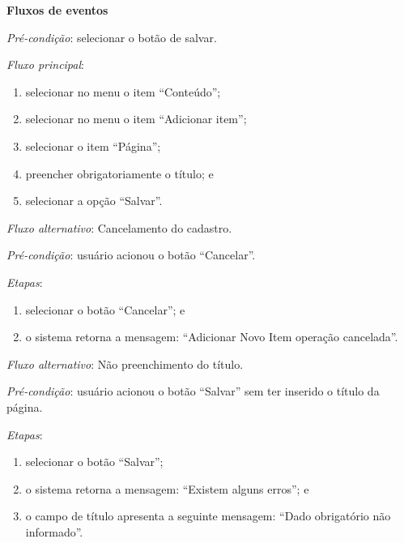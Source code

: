 \documentclass[a4paper,12pt]{article}
\begin{document}
\begin{center}
\textbf{\huge{Fluxos de eventos}}
\end{center}

\vspace{0.7cm}

\noindent \textit{Pré-condição}: selecionar o botão de salvar.

\noindent \textit{Fluxo principal}:

\begin{enumerate}
    \item selecionar no menu o item ``Conteúdo'';
    \item selecionar no menu o item ``Adicionar item'';
    \item selecionar o item ``Página'';
    \item preencher obrigatoriamente o título; e
    \item selecionar a opção ``Salvar''.
\end{enumerate}

\noindent \textit{Fluxo alternativo}: Cancelamento do cadastro.

\noindent \textit{Pré-condição}: usuário acionou o botão ``Cancelar''.

\noindent \textit{Etapas}:

\begin{enumerate}
    \item selecionar o botão ``Cancelar''; e
    \item o sistema retorna a mensagem: ``Adicionar Novo Item operação cancelada''.
\end{enumerate}

\noindent \textit{Fluxo alternativo}: Não preenchimento do título.

\noindent \textit{Pré-condição}: usuário acionou o botão ``Salvar'' sem ter inserido o título da página.

\noindent \textit{Etapas}:

\begin{enumerate}
    \item selecionar o botão ``Salvar'';
    \item o sistema retorna a mensagem: ``Existem alguns erros''; e
    \item o campo de título apresenta a seguinte mensagem: ``Dado obrigatório não informado''.
\end{enumerate}
\end{document}
